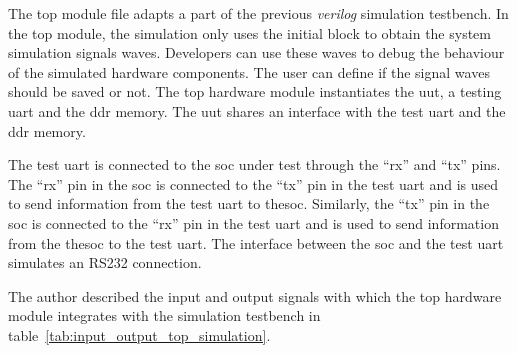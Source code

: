 The top module file adapts a part of the previous \textit{verilog} simulation testbench. In the top module, the simulation only uses the initial block to obtain the system simulation signals waves. Developers can use these waves to debug the behaviour of the simulated hardware components. The user can define if the signal waves should be saved or not. The top hardware module instantiates the \acrfull{uut}, a testing \acrshort{uart} and the \acrshort{ddr} memory. The \acrshort{uut} shares an interface with the test \acrshort{uart} and the \acrshort{ddr} memory.

The test \acrshort{uart} is connected to the \acrshort{soc} under test through the \enquote{rx} and \enquote{tx} pins. The \enquote{rx} pin in the \acrshort{soc} is connected to the \enquote{tx} pin in the test \acrshort{uart} and is used to send information from the test \acrshort{uart} to the\acrshort{soc}. Similarly, the \enquote{tx} pin in the \acrshort{soc} is connected to the \enquote{rx} pin in the test \acrshort{uart} and is used to send information from the the\acrshort{soc} to the test \acrshort{uart}. The interface between the \acrshort{soc} and the test \acrshort{uart} simulates an RS232 connection.

The author described the input and output signals with which the top hardware module integrates with the simulation testbench in table~\ref{tab:input_output_top_simulation}.

